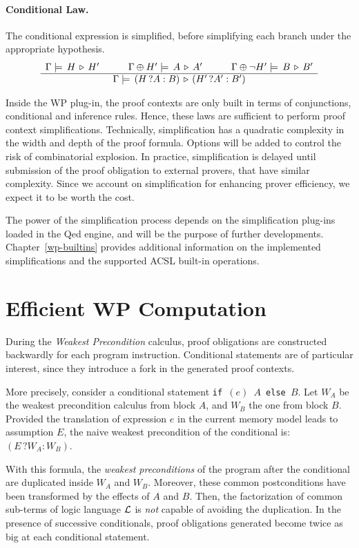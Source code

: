 \paragraph{Conditional Law.}
The conditional expression is simplified, before simplifying each
branch under the appropriate hypothesis.
\[\begin{array}{c}{\Gamma\models\,H\,\triangleright\,H'\quad\quad\quad\Gamma\oplus H'\models\,A\,\triangleright\,A'\quad\quad\quad\Gamma\oplus \neg H'\models\,B\,\triangleright\,B'}\\\hline{\Gamma\models\,(H\,?A:B)\,\triangleright\,(H'\,?A':B')}\end{array}
\]

Inside the \textsf{WP} plug-in, the proof contexts are only built in
terms of conjunctions, conditional and inference rules. Hence, these
laws are sufficient to perform proof context simplifications.
Technically, simplification has a quadratic complexity in the width
and depth of the proof formula. Options will be added to control the
risk of combinatorial explosion. In practice, simplification is
delayed until submission of the proof obligation to external provers,
that have similar complexity. Since we account on simplification for
enhancing prover efficiency, we expect it to be worth the cost.

The power of the simplification process depends on the simplification plug-ins
loaded in the \textsf{Qed} engine, and will be the purpose of further
developments. Chapter~\ref{wp-builtins} provides additional information on the
implemented simplifications and the supported \textsf{ACSL} built-in operations.

\section{Efficient WP Computation}

During the \emph{Weakest Precondition} calculus, proof obligations are
constructed backwardly for each program instruction. Conditional
statements are of particular interest, since they introduce a fork in
the generated proof contexts.

More precisely, consider a conditional statement \texttt{if $(e)$ $A$
  else $B$}. Let $W_A$ be the weakest precondition calculus from block
$A$, and $W_B$ the one from block $B$. Provided the translation of expression
$e$ in the current memory model leads to assumption $E$, the naive
weakest precondition of the conditional is: $(E \, ? W_A : W_B)$.

With this formula, the \emph{weakest preconditions} of the program
after the conditional are duplicated inside $W_A$ and $W_B$. Moreover, these
common postconditions have been transformed by the effects of $A$ and
$B$.  Then, the factorization of common sub-terms of logic language
$\cal{L}$ is \emph{not} capable of avoiding the duplication. In the presence of
successive conditionals, proof obligations generated become twice as
big at each conditional statement.

